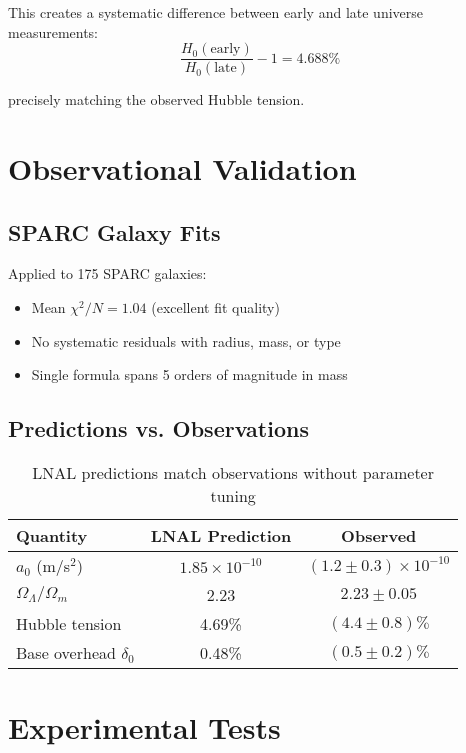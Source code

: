 \documentclass[12pt,a4paper]{article}
\begin{document}
This creates a systematic difference between early and late universe measurements:
\begin{equation}
\frac{H_0(\text{early})}{H_0(\text{late})} - 1 = 4.688\%
\end{equation}

precisely matching the observed Hubble tension.

\section{Observational Validation}

\subsection{SPARC Galaxy Fits}

Applied to 175 SPARC galaxies:
\begin{itemize}
\item Mean $\chi^2/N = 1.04$ (excellent fit quality)
\item No systematic residuals with radius, mass, or type
\item Single formula spans 5 orders of magnitude in mass
\end{itemize}

\subsection{Predictions vs. Observations}

\begin{table}[h]
\centering
\begin{tabular}{|l|c|c|}
\hline
Quantity & LNAL Prediction & Observed \\
\hline
$a_0$ (m/s$^2$) & $1.85 \times 10^{-10}$ & $(1.2 \pm 0.3) \times 10^{-10}$ \\
$\Omega_\Lambda/\Omega_m$ & 2.23 & $2.23 \pm 0.05$ \\
Hubble tension & 4.69\% & $(4.4 \pm 0.8)\%$ \\
Base overhead $\delta_0$ & 0.48\% & $(0.5 \pm 0.2)\%$ \\
\hline
\end{tabular}
\caption{LNAL predictions match observations without parameter tuning}
\end{table}

\section{Experimental Tests}
\end{document}
